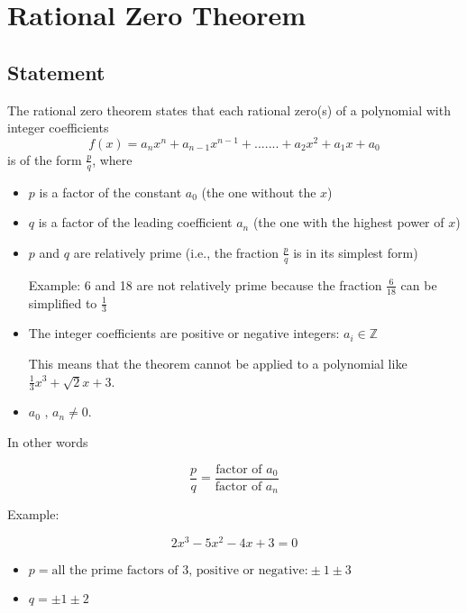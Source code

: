 \section{Rational Zero Theorem}\label{subsec:s_polynomials}

\subsection{Statement}

The rational zero theorem states that each rational zero(s) of a polynomial with integer coefficients 
\begin{equation}
f(x) = a_nx^n+a_{n-1}x^{n-1}+.......+a_2x^2+a_1x+a_0
\end{equation}
is of the form $\frac{p}{q}$, where
\begin{itemize}
\item $p$ is a factor of the constant $a_0$ (the one without the $x$)
\item $q$ is a factor of the leading coefficient $a_n$ (the one with the highest power of $x$)
\item $p$ and $q$ are relatively prime (i.e., the fraction $\frac{p}{q}$ is in its simplest form)

Example: 6 and 18 are not relatively prime because the fraction $\frac{6}{18}$ can be simplified to $\frac{1}{3}$
\item The integer coefficients are positive or negative integers: $a_{i}\in \mathbb{Z}$ 

This means that the theorem cannot be applied to a polynomial like $\frac{1}{3}x^3+\sqrt{2}x+3$.
\item $a_{0}$ , $a_{n}\neq 0$.
\end{itemize}

In other words

\begin{equation}
\frac{p}{q} = \frac{\textrm{factor of }a_0}{\textrm{factor of }a_n}
\end{equation}

Example:

\begin{equation}
2x^3-5x^2-4x+3=0
\end{equation}

\begin{itemize}
\item $p=\textrm{all the prime factors of 3, positive or negative:} \pm 1 \pm 3$
\item $q=\pm 1\pm 2$
\end{itemize}

